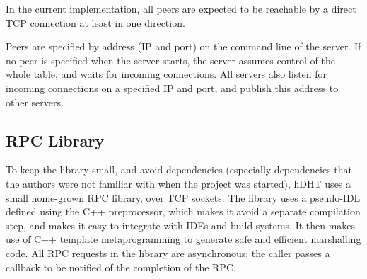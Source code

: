 In the current implementation, all peers are expected to be reachable by a direct TCP connection at least in one direction.

Peers are specified by address (IP and port) on the command line of the server.
If no peer is specified when the server starts, the server assumes control of the whole table, and waits for incoming connections.
All servers also listen for incoming connections on a specified IP and port, and publish this address to other servers.

\subsection{RPC Library}

To keep the library small, and avoid dependencies (especially dependencies that the authors were not familiar with when the project was started), hDHT uses a small home-grown RPC library, over TCP sockets.
The library uses a pseudo-IDL defined using the C++ preprocessor, which makes it avoid a separate compilation step, and makes it easy to integrate with IDEs and build systems.
It then makes use of C++ template metaprogramming to generate safe and efficient marshalling code.
All RPC requests in the library are asynchronous; the caller passes a callback to be notified of the completion of the RPC.
